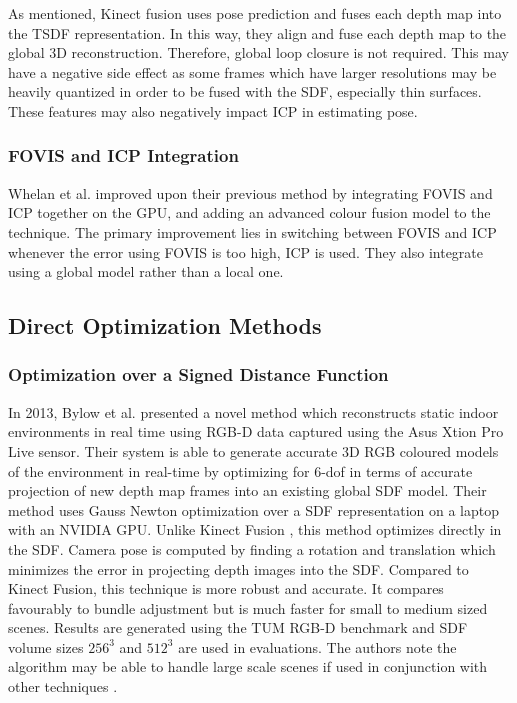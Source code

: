 As mentioned, Kinect fusion uses pose prediction and fuses each depth map into the TSDF representation. In this way, they align and fuse each depth map to the global 3D reconstruction. Therefore, global loop closure is not required. This may have a negative side effect as some frames which have larger resolutions may be heavily quantized in order to be fused with the SDF, especially thin surfaces. These features may also negatively impact ICP in estimating pose. \\


\subsubsection{FOVIS and ICP Integration}

Whelan et al. improved \cite{Whelan13Robust} upon their previous method \cite{Whelan12Kintinuous} by integrating FOVIS and ICP together on the GPU, and adding an advanced colour fusion model to the technique. The primary improvement lies in switching between FOVIS and ICP whenever the error using FOVIS is too high, ICP is used. They also integrate using a global model rather than a local one. \\


\subsection{Direct Optimization Methods}

\subsubsection{Optimization over a Signed Distance Function}
\label{BylowsSection}
In 2013, Bylow et al. \cite{Bylow13Real} presented a novel method which reconstructs static indoor environments in real time using RGB-D data captured using the Asus Xtion Pro Live sensor. Their system is able to generate accurate 3D RGB coloured models of the environment in real-time by optimizing for 6-dof in terms of accurate projection of new depth map frames into an existing global SDF model. Their method uses Gauss Newton optimization over a SDF representation on a laptop with an NVIDIA GPU. Unlike Kinect Fusion \cite{Newcombe11Kinectfusion}, this method optimizes directly in the SDF. Camera pose is computed by finding a rotation and translation which minimizes the error in projecting depth images into the SDF. Compared to Kinect Fusion, this technique is more robust and accurate. It compares favourably to bundle adjustment but is much faster for small to medium sized scenes. Results are generated using the TUM RGB-D benchmark and SDF volume sizes $256^3$ and $512^3$ are used in evaluations. The authors note the algorithm may be able to handle large scale scenes if used in conjunction with other techniques \cite{Kaess11Isam2,Kummerle11G}. \\

